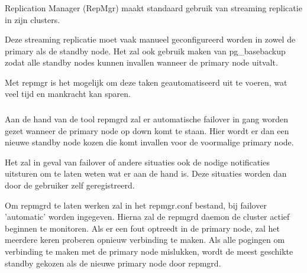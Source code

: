 
\subsubsection{}
\label{subsubsec:Replicatie}

Replication Manager (RepMgr) maakt standaard gebruik van streaming replicatie in zijn clusters.

Deze streaming replicatie moet vaak manueel geconfigureerd worden in zowel de primary als de standby node. Het zal ook gebruik maken van pg\_basebackup zodat alle standby nodes kunnen invallen wanneer de primary node uitvalt.

Met repmgr is het mogelijk om deze taken geautomatiseerd uit te voeren, wat veel tijd en mankracht kan sparen.

\subsubsection{}
\label{subsubsec:Failover}


Aan de hand van de tool repmgrd zal er automatische failover in gang worden gezet wanneer de primary node op down komt te staan. Hier wordt er dan een nieuwe standby node kozen die komt invallen voor de voormalige primary node.  

Het zal in geval van failover of andere situaties ook de nodige notificaties uitsturen om te laten weten wat er aan de hand is. Deze situaties worden dan door de gebruiker zelf geregistreerd.

Om repmgrd te laten werken zal in het repmgr.conf bestand, bij failover 'automatic' worden ingegeven. Hierna zal de repmgrd daemon de cluster actief beginnen te monitoren. Als er een fout optreedt in de primary node, zal het meerdere keren proberen opnieuw verbinding te maken. Als alle pogingen om verbinding te maken met de primary node mislukken, wordt de meest geschikte standby gekozen als de nieuwe primary node door repmgrd.


